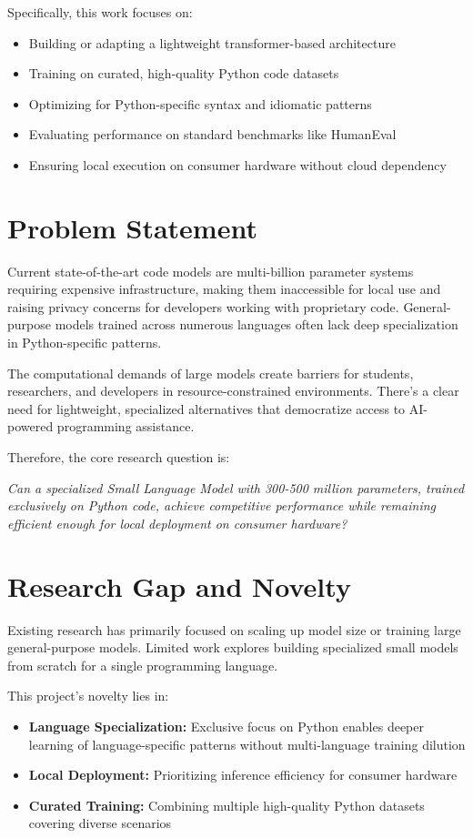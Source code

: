 \documentclass[preprint,12pt]{elsarticle}
\begin{document}
Specifically, this work focuses on:
\begin{itemize}
\item Building or adapting a lightweight transformer-based architecture
\item Training on curated, high-quality Python code datasets
\item Optimizing for Python-specific syntax and idiomatic patterns
\item Evaluating performance on standard benchmarks like HumanEval
\item Ensuring local execution on consumer hardware without cloud dependency
\end{itemize}

\section{Problem Statement}

Current state-of-the-art code models are multi-billion parameter systems requiring expensive infrastructure, making them inaccessible for local use and raising privacy concerns for developers working with proprietary code. General-purpose models trained across numerous languages often lack deep specialization in Python-specific patterns.

The computational demands of large models create barriers for students, researchers, and developers in resource-constrained environments. There's a clear need for lightweight, specialized alternatives that democratize access to AI-powered programming assistance.

Therefore, the core research question is:

\textit{Can a specialized Small Language Model with 300-500 million parameters, trained exclusively on Python code, achieve competitive performance while remaining efficient enough for local deployment on consumer hardware?}

\section{Research Gap and Novelty}

Existing research has primarily focused on scaling up model size or training large general-purpose models. Limited work explores building specialized small models from scratch for a single programming language.

This project's novelty lies in:
\begin{itemize}
\item \textbf{Language Specialization:} Exclusive focus on Python enables deeper learning of language-specific patterns without multi-language training dilution
\item \textbf{Local Deployment:} Prioritizing inference efficiency for consumer hardware
\item \textbf{Curated Training:} Combining multiple high-quality Python datasets covering diverse scenarios
\end{itemize}
\end{document}
